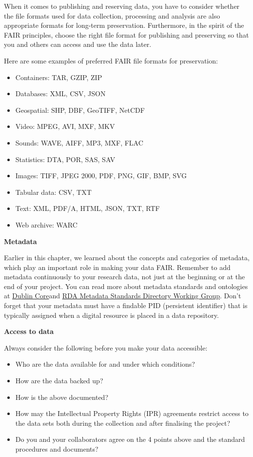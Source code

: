 \documentclass[
]{book}
\providecommand{\tightlist}{%
  \setlength{\itemsep}{0pt}\setlength{\parskip}{0pt}}
\begin{document}
When it comes to publishing and reserving data, you have to consider whether the file formats used for data collection, processing and analysis are also appropriate formats for long-term preservation. Furthermore, in the spirit of the FAIR principles, choose the right file format for publishing and preserving so that you and others can access and use the data later.

Here are some examples of preferred FAIR file formats for preservation:

\begin{itemize}
\tightlist
\item
  Containers: TAR, GZIP, ZIP
\item
  Databases: XML, CSV, JSON
\item
  Geospatial: SHP, DBF, GeoTIFF, NetCDF
\item
  Video: MPEG, AVI, MXF, MKV
\item
  Sounds: WAVE, AIFF, MP3, MXF, FLAC
\item
  Statistics: DTA, POR, SAS, SAV
\item
  Images: TIFF, JPEG 2000, PDF, PNG, GIF, BMP, SVG
\item
  Tabular data: CSV, TXT
\item
  Text: XML, PDF/A, HTML, JSON, TXT, RTF
\item
  Web archive: WARC
\end{itemize}

\textbf{Metadata}

Earlier in this chapter, we learned about the concepts and categories of metadata, which play an important role in making your data FAIR. Remember to add metadata continuously to your research data, not just at the beginning or at the end of your project. You can read more about metadata standards and ontologies at \href{https://www.dublincore.org/}{Dublin Core}and \href{http://rd-alliance.github.io/metadata-directory/}{RDA Metadata Standards Directory Working Group}. Don't forget that your metadata must have a findable PID (persistent identifier) that is typically assigned when a digital resource is placed in a data repository.

\textbf{Access to data}

Always consider the following before you make your data accessible:

\begin{itemize}
\tightlist
\item
  Who are the data available for and under which conditions?
\item
  How are the data backed up?
\item
  How is the above documented?
\item
  How may the Intellectual Property Rights (IPR) agreements restrict access to the data sets both during the collection and after finalising the project?
\item
  Do you and your collaborators agree on the 4 points above and the standard procedures and documents?
\end{itemize}
\end{document}

